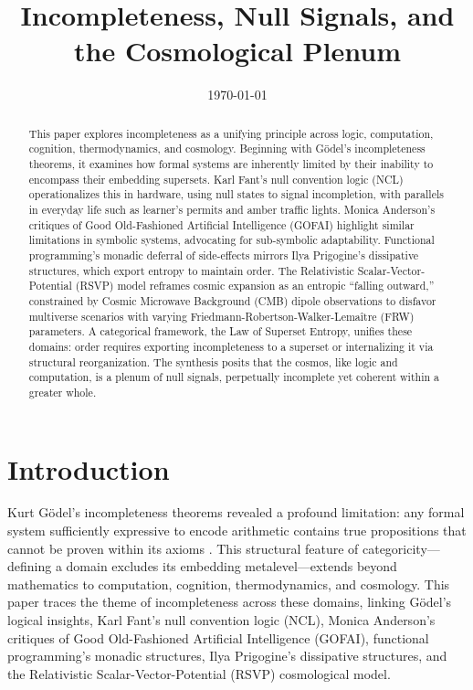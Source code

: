 \documentclass{article}
\begin{document}
\title{Incompleteness, Null Signals, and the Cosmological Plenum}
\author{}
\date{\today}
\maketitle

\begin{abstract}
This paper explores incompleteness as a unifying principle across logic, computation, cognition, thermodynamics, and cosmology. Beginning with G\"{o}del's incompleteness theorems, it examines how formal systems are inherently limited by their inability to encompass their embedding supersets. Karl Fant's null convention logic (NCL) operationalizes this in hardware, using null states to signal incompletion, with parallels in everyday life such as learner's permits and amber traffic lights. Monica Anderson's critiques of Good Old-Fashioned Artificial Intelligence (GOFAI) highlight similar limitations in symbolic systems, advocating for sub-symbolic adaptability. Functional programming's monadic deferral of side-effects mirrors Ilya Prigogine's dissipative structures, which export entropy to maintain order. The Relativistic Scalar-Vector-Potential (RSVP) model reframes cosmic expansion as an entropic ``falling outward,'' constrained by Cosmic Microwave Background (CMB) dipole observations to disfavor multiverse scenarios with varying Friedmann-Robertson-Walker-Lema\^{i}tre (FRW) parameters. A categorical framework, the Law of Superset Entropy, unifies these domains: order requires exporting incompleteness to a superset or internalizing it via structural reorganization. The synthesis posits that the cosmos, like logic and computation, is a plenum of null signals, perpetually incomplete yet coherent within a greater whole.
\end{abstract}

\section{Introduction}
\label{sec:intro}
Kurt G\"{o}del's incompleteness theorems revealed a profound limitation: any formal system sufficiently expressive to encode arithmetic contains true propositions that cannot be proven within its axioms \citep{godel1931}. This structural feature of categoricity---defining a domain excludes its embedding metalevel---extends beyond mathematics to computation, cognition, thermodynamics, and cosmology. This paper traces the theme of incompleteness across these domains, linking G\"{o}del's logical insights, Karl Fant's null convention logic (NCL), Monica Anderson's critiques of Good Old-Fashioned Artificial Intelligence (GOFAI), functional programming's monadic structures, Ilya Prigogine's dissipative structures, and the Relativistic Scalar-Vector-Potential (RSVP) cosmological model.
\end{document}
